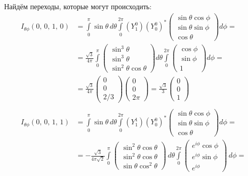 Найдём переходы, которые могут происходить:
\begin{align*}
    I_{\theta\phi}(0,\,0,\,1,\,0) &= \int\limits_{0}^{\pi}\sin\theta\,d\theta\int\limits_{0}^{2\pi}(Y^0_1)(Y^0_0)^*  \begin{pmatrix} \sin\theta\cos\phi \\ \sin\theta\sin\phi \\ \cos\theta \end{pmatrix} d\phi = \\
    & = \frac{\sqrt{3}}{4\pi}\int\limits_{0}^{\pi} \begin{pmatrix} \sin^3\theta\\ \sin^3 \theta \\ \sin^2\theta\cos\theta \end{pmatrix} d\theta \int\limits_{0}^{2\pi} \begin{pmatrix} \cos\phi \\ \sin\phi \\ 1 \end{pmatrix} d\phi = \\
    & = \frac{\sqrt{3}}{4\pi}\begin{pmatrix} 0 \\  0 \\ 2/3 \end{pmatrix} \begin{pmatrix} 0 \\  0 \\ 2\pi \end{pmatrix} = \frac{\sqrt{3}}{3}\begin{pmatrix} 0 \\  0 \\ 1 \end{pmatrix} \\ 
    \\
    I_{\theta\phi}(0,\,0,\,1,\,1) &= \int\limits_{0}^{\pi}\sin\theta\,d\theta\int\limits_{0}^{2\pi}(Y^1_1)(Y^0_0)^*  \begin{pmatrix} \sin\theta\cos\phi \\ \sin\theta\sin\phi \\ \cos\theta \end{pmatrix} d\phi = \\
    & = -\frac{\sqrt{3}}{4\pi\sqrt{2}}\int\limits_{0}^{\pi} \begin{pmatrix} \sin^2 \theta\cos\theta \\ \sin^2 \theta\cos\theta \\ \sin\theta\cos^2\theta \end{pmatrix} \, d\theta \int\limits_{0}^{2\pi} \begin{pmatrix} e^{i\phi}\cos\phi \\ e^{i\phi}\sin\phi \\ e^{i\phi} \end{pmatrix} \, d\phi = \\

\end{align*}
